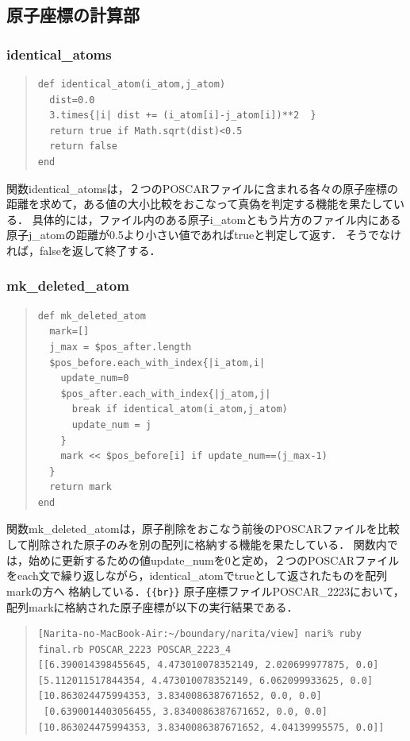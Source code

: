 \subsection{原子座標の計算部}
\subsubsection{identical\_atoms}\begin{quote}\begin{verbatim}
def identical_atom(i_atom,j_atom)
  dist=0.0
  3.times{|i| dist += (i_atom[i]-j_atom[i])**2  }
  return true if Math.sqrt(dist)<0.5
  return false
end
\end{verbatim}\end{quote}
関数identical\_atomsは，２つのPOSCARファイルに含まれる各々の原子座標の距離を求めて，ある値の大小比較をおこなって真偽を判定する機能を果たしている．
具体的には，ファイル内のある原子i\_atomともう片方のファイル内にある原子j\_atomの距離が0.5より小さい値であればtrueと判定して返す．
そうでなければ，falseを返して終了する．

\subsubsection{mk\_deleted\_atom}\begin{quote}\begin{verbatim}
def mk_deleted_atom
  mark=[]
  j_max = $pos_after.length
  $pos_before.each_with_index{|i_atom,i|
    update_num=0
    $pos_after.each_with_index{|j_atom,j|
      break if identical_atom(i_atom,j_atom)
      update_num = j
    }
    mark << $pos_before[i] if update_num==(j_max-1)
  }
  return mark
end
\end{verbatim}\end{quote}
関数mk\_deleted\_atomは，原子削除をおこなう前後のPOSCARファイルを比較して削除された原子のみを別の配列に格納する機能を果たしている．
関数内では，始めに更新するための値update\_numを0と定め，２つのPOSCARファイルをeach文で繰り返しながら，identical\_atomでtrueとして返されたものを配列markの方へ
格納している．\verb|{{br}}|
原子座標ファイルPOSCAR\_2223において，配列markに格納された原子座標が以下の実行結果である．
\begin{quote}\begin{verbatim}
[Narita-no-MacBook-Air:~/boundary/narita/view] nari% ruby final.rb POSCAR_2223 POSCAR_2223_4
[[6.390014398455645, 4.473010078352149, 2.020699977875, 0.0] 
[5.112011517844354, 4.473010078352149, 6.062099933625, 0.0] 
[10.863024475994353, 3.8340086387671652, 0.0, 0.0]
 [0.6390014403056455, 3.8340086387671652, 0.0, 0.0] 
[10.863024475994353, 3.8340086387671652, 4.04139995575, 0.0]]
\end{verbatim}\end{quote}
